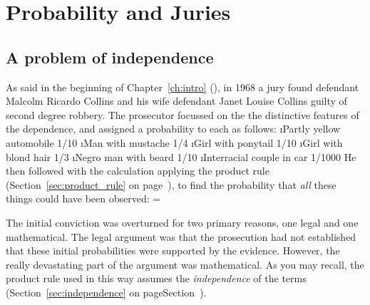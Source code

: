 






\section{Probability and Juries}

\subsection{A problem of independence}

As said in the beginning of Chapter~\ref{ch:intro} (), in 1968 a jury found defendant Malcolm Ricardo Collins and his wife defendant Janet Louise Collins guilty of second degree robbery.  The prosecutor focussed on the the distinctive features of the dependence, and assigned a probability to each as follows\cite{SULLIVAN:fk}:
\be
\i Partly yellow automobile 1/10
\i Man with mustache 1/4
\i Girl with ponytail 1/10
\i Girl with blond hair 1/3
\i Negro man with beard 1/10
\i Interracial couple in car 1/1000
\ee
He then followed with the calculation applying the product rule (Section~\ref{sec:product_rule} on page~\pageref{sec:product_rule}), to find the probability that \emph{all} these things could have been observed:
\beqn
{}\times{}\times{}\times{}\times{}\times{} = 
\eeqn

The initial conviction was overturned for two primary reasons, one legal and one mathematical.  The legal argument was that the prosecution had not established that these initial probabilities were supported by the evidence.  However, the really devastating part of the argument was mathematical.  As you may recall, the product rule used in this way assumes the \emph{independence} of the terms (Section~\ref{sec:independence} on pageSection~\pageref{sec:independence}).  

